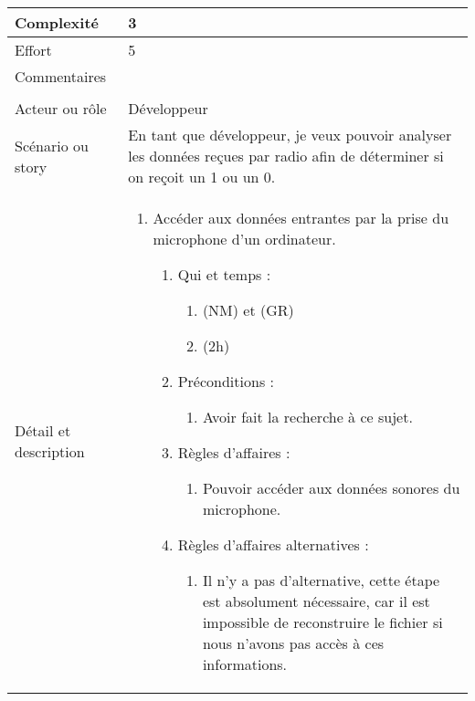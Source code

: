 \begin{longtable}{|l|p{}|}
\hline
    Complexité & 3 \\
\hline
    Effort & 5 \\
\hline
    Commentaires & \\

\hline
    \rowcolor{Gray}
    \multicolumn{2}{|l|}{3} \\
\hline
    Acteur ou rôle & Développeur \\
\hline
    Scénario ou story & En tant que développeur, je veux pouvoir analyser les données reçues par radio afin de déterminer si on reçoit un 1 ou un 0. \\
\hline
    Détail et description &
        \begin{enumerate}[label*=\arabic*.]
            \item Accéder aux données entrantes par la prise du microphone d'un ordinateur.
                \begin{enumerate}[label*=\arabic*.]
                                \item Qui et temps :
                                \begin{enumerate}[label*=\arabic*.]
                                    \item (NM) et (GR)
                                    \item (2h)
                                \end{enumerate}
                                \item Préconditions :
                                \begin{enumerate}[label*=\arabic*.]
                                    \item Avoir fait la recherche à ce sujet.
                                \end{enumerate}
                                \item Règles d'affaires :
                                \begin{enumerate}[label*=\arabic*.]
                                    \item Pouvoir accéder aux données sonores du microphone.
                                \end{enumerate}
                                \item Règles d'affaires alternatives :
                                \begin{enumerate}[label*=\arabic*.]
                                    \item Il n'y a pas d'alternative, cette étape est absolument nécessaire, car il est impossible de reconstruire le fichier si nous n'avons pas accès à ces informations.

\end{enumerate}
\end{enumerate}
\end{enumerate}
\end{longtable}
